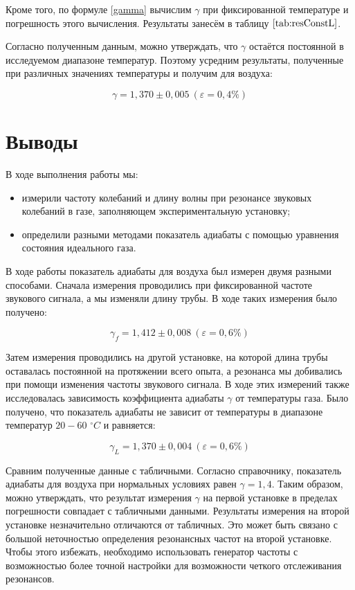 \documentclass[a4paper,12pt]{article}
\theoremstyle{definition}
\begin{document}
	Кроме того, по формуле \eqref{gamma} вычислим $ \gamma $ при фиксированной температуре и погрешность этого вычисления. Результаты занесём в таблицу $ \ref{tab:resConstL} $. 
	
	Согласно полученным данным, можно утверждать, что $ \gamma $ остаётся постоянной в исследуемом диапазоне температур. Поэтому усредним результаты, полученные при различных значениях температуры и получим для воздуха:
	
	\[ \gamma = 1,370 \pm 0,005 \ (\varepsilon=0,4\%) \]
	
	\section{Выводы}
	
	В ходе выполнения работы мы:
	
	\begin{itemize}
		\item измерили частоту колебаний и длину волны при резонансе звуковых колебаний в газе, заполняющем экспериментальную установку;
		\item определили разными методами показатель адиабаты с помощью уравнения состояния идеального газа.
	\end{itemize}
	
	В ходе работы показатель адиабаты для воздуха был измерен двумя разными способами. Сначала измерения проводились при фиксированной частоте звукового сигнала, а мы изменяли длину трубы. В ходе таких измерения было получено:
	
	\[ \gamma_f = 1,412 \pm 0,008 \ (\varepsilon=0,6\%) \]
	
	Затем измерения проводились на другой установке, на которой длина трубы оставалась постоянной на протяжении всего опыта, а резонанса мы добивались при помощи изменения частоты звукового сигнала. В ходе этих измерений также исследовалась зависимость коэффициента адиабаты $ \gamma $ от температуры газа. Было получено, что показатель адиабаты не зависит от температуры в диапазоне температур $ 20-60 $ $ ^\circ C $ и равняется:
	
	\[ \gamma_L = 1,370 \pm 0,004 \ (\varepsilon=0,6\%) \]
	
	Сравним полученные данные с табличными. Согласно справочнику, показатель адиабаты для воздуха при нормальных условиях равен $ \gamma = 1,4 $. Таким образом, можно утверждать, что результат измерения $ \gamma $ на первой установке в пределах погрешности совпадает с табличными данными. Результаты измерения на второй установке незначительно отличаются от табличных. Это может быть связано с большой неточностью определения резонансных частот на второй установке. Чтобы этого избежать, необходимо использовать генератор частоты с возможностью более точной настройки для возможности четкого отслеживания резонансов.
	
\end{document}
